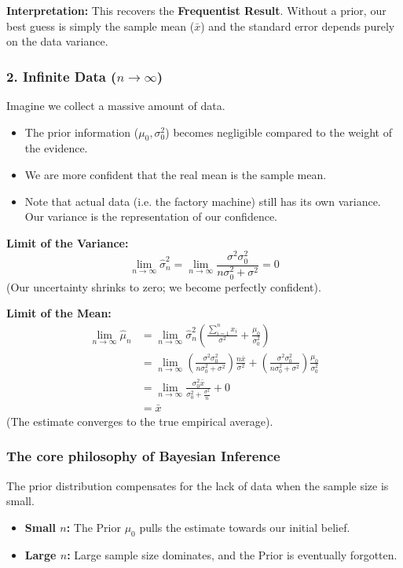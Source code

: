 \documentclass[../Probability.tex]{subfiles}
\begin{document}
\noindent\textbf{Interpretation:}
This recovers the \textbf{Frequentist Result}. Without a prior, our best guess is simply the sample mean ($\bar{x}$) and the standard error depends purely on the data variance.

\subsubsection*{2. Infinite Data ($n \to \infty$)}
Imagine we collect a massive amount of data.
\begin{itemize}
    \item The prior information ($\mu_0, \sigma_0^2$) becomes negligible compared to the weight of the evidence.
    \item We are more confident that the real mean is the sample mean.
    \item Note that actual data (i.e. the factory machine) still has its own variance. Our variance is the representation of our confidence.
\end{itemize}

\noindent\textbf{Limit of the Variance:}
\begin{equation*}
\lim_{n \to \infty} \hat{\sigma}_n^2 = \lim_{n \to \infty} \frac{\sigma^2 \sigma_0^2}{n\sigma_0^2 + \sigma^2} = 0
\end{equation*}
(Our uncertainty shrinks to zero; we become perfectly confident).

\noindent\textbf{Limit of the Mean:}
\begin{align*}
\lim_{n \to \infty} \hat{\mu}_n &= \lim_{n \to \infty} \hat{\sigma}_n^2 \left( \frac{\sum_{i=1}^n x_i}{\sigma^2} + \frac{\mu_0}{\sigma_0^2} \right) \\
&= \lim_{n \to \infty} \left( \frac{\sigma^2 \sigma_0^2}{n\sigma_0^2 + \sigma^2} \right) \frac{n\bar{x}}{\sigma^2} + \left( \frac{\sigma^2 \sigma_0^2}{n\sigma_0^2 + \sigma^2} \right) \frac{\mu_0}{\sigma_0^2} \\
&= \lim_{n \to \infty} \frac{\sigma_0^2 \bar{x}}{\sigma_0^2 + \frac{\sigma^2}{n}} + 0 \\
&= \bar{x}
\end{align*}
(The estimate converges to the true empirical average).

\subsubsection{The core philosophy of Bayesian Inference}
The prior distribution compensates for the lack of data when the sample size is small.
\begin{itemize}
    \item \textbf{Small $n$:} The Prior $\mu_0$ pulls the estimate towards our initial belief.
    \item \textbf{Large $n$:} Large sample size dominates, and the Prior is eventually forgotten.
\end{itemize}
\end{document}
